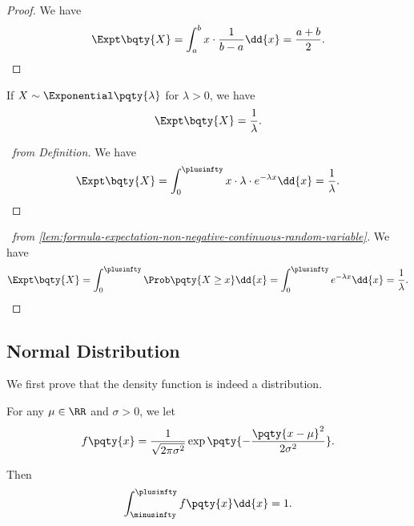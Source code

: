\begin{proof}
    We have
    \[
        \Expt\bqty{X} = \int_{a}^{b} x \cdot \frac{1}{b - a} \dd{x} = \frac{a + b}{2}.
    \]
\end{proof}

\begin{proposition}
    \label{prop:expt-exponential}%
    If \(X \sim \Exponential\pqty{\lambda}\) for \(\lambda > 0\), we have
    \[
        \Expt\bqty{X} = \frac{1}{\lambda}.
    \]
\end{proposition}

\begin{proof}[\proofname\ from Definition]
    We have
    \[
        \Expt\bqty{X} = \int_{0}^{\plusinfty} x \cdot \lambda \cdot e^{-\lambda x} \dd{x} = \frac{1}{\lambda}.
    \]
\end{proof}

\begin{proof}[\proofname\ from \autoref{lem:formula-expectation-non-negative-continuous-random-variable}]
    We have
    \[
        \Expt\bqty{X} = \int_{0}^{\plusinfty} \Prob\pqty{X \geq x} \dd{x} = \int_{0}^{\plusinfty} e^{-\lambda x} \dd{x} = \frac{1}{\lambda}.
    \]
\end{proof}

\subsection{Normal Distribution}

We first prove that the density function is indeed a distribution.

\begin{proposition}
    \label{prop:gaussian-integral}%
    For any \(\mu \in \RR\) and \(\sigma > 0\), we let
    \[
        f\pqty{x} = \frac{1}{\sqrt{2 \pi \sigma^2}} \exp\pqty{-\frac{\pqty{x - \mu}^2}{2 \sigma^2}}.
    \]

    Then
    \[
        \int_{\minusinfty}^{\plusinfty} f\pqty{x} \dd{x} = 1.
    \]
\end{proposition}

